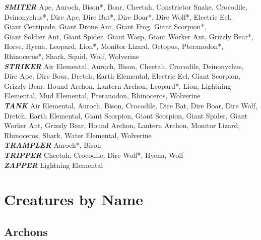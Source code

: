 \textbf{\textit{SMITER}} Ape, Auroch, Bison*, Boar, Cheetah, Constrictor Snake, Crocodile, Deinonychus*, Dire Ape, Dire Bat*, Dire Boar*, Dire Wolf*, Electric Eel, \\ Giant Centipede, Giant Drone Ant, Giant Frog, Giant Scorpion*, \\ Giant Soldier Ant, Giant Spider, Giant Wasp, Giant Worker Ant, Grizzly Bear*, \\ Horse, Hyena, Leopard, Lion*, Monitor Lizard, Octopus, Pteranodon*, Rhinoceros*, Shark, Squid, Wolf, Wolverine \\

\textbf{\textit{STRIKER}} Air Elemental, Auroch, Bison, Cheetah, Crocodile, Deinonychus, Dire Ape, Dire Boar, Dretch, Earth Elemental, Electric Eel, Giant Scorpion, Grizzly Bear, Hound Archon, Lantern Archon, Leopard*, Lion, Lightning Elemental, Mud Elemental, Pteranodon, Rhinoceros, Wolverine \\

\textbf{\textit{TANK}} Air Elemental, Auroch, Bison, Crocodile, Dire Bat, Dire Boar, Dire Wolf, Dretch, Earth Elemental, Giant Scorpion, Giant Scorpion, Giant Spider, Giant Worker Ant, Grizzly Bear, Hound Archon, Lantern Archon, Monitor Lizard, Rhinoceros, Shark, Water Elemental, Wolverine \\

\textbf{\textit{TRAMPLER}} Auroch*, Bison \\

\textbf{\textit{TRIPPER}} Cheetah, Crocodile, Dire Wolf*, Hyena, Wolf  \\

\textbf{\textit{ZAPPER}} Lightning Elemental \\

\newpage

\section{Creatures by Name} 

\subsection{Archons}


